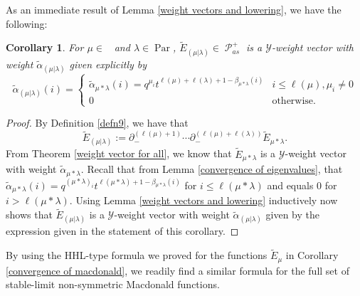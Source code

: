 \documentclass[11pt]{article}
\newtheorem{coro}[theo]{Corollary}
\theoremstyle{definition}
\numberwithin{equation}{section}
\newcommand{\y}{{ \mathscr{Y} }}
\DeclareMathOperator{\sP}{\mathscr{P} }
\DeclareMathOperator{\Par}{\mathrm{Par}}
\DeclareMathOperator{\Compred}{\mathrm{Comp}^{\textit{red}}}
\begin{document}
As an immediate result of Lemma \ref{weight vectors and lowering}, we have the following:
\begin{coro}\label{stable macdonald are weight vectors}
    For $\mu \in \Compred$ and $\lambda \in \Par$,  $\widetilde{E}_{(\mu|\lambda)} \in \sP_{as}^{+}$ is a $\y$-weight vector with weight $\widetilde{\alpha}_{(\mu|\lambda)}$ given explicitly by
\begin{equation}
    \widetilde{\alpha}_{(\mu|\lambda)}(i) = 
    \begin{cases}
    \widetilde{\alpha}_{\mu*\lambda}(i) = q^{\mu_i}t^{\ell(\mu)+\ell(\lambda)+1-\beta_{\mu*\lambda}(i)} & i\leq \ell(\mu) , \mu_i \neq 0 \\
    0 & \text{otherwise}.
     \end{cases}
\end{equation}
\end{coro}
\begin{proof}
   By Definition \ref{defn9}, we have that $$\widetilde{E}_{(\mu|\lambda)} :=  \partial_{-}^{(\ell(\mu)+1)}\cdots \partial_{-}^{(\ell(\mu)+\ell(
\lambda))} \widetilde{E}_{\mu*\lambda}. $$
From Theorem \ref{weight vector for all}, we know that $\widetilde{E}_{\mu*\lambda}$ is a $\y$-weight vector with weight $\widetilde{\alpha}_{\mu*\lambda}.$ Recall that from Lemma \ref{convergence of eigenvalues}, that $\widetilde{\alpha}_{\mu*\lambda}(i) = q^{(\mu*\lambda)_i}t^{\ell(\mu*\lambda)+1-\beta_{\mu*\lambda}(i)}$ for $i \leq \ell(\mu*\lambda)$ and equals $0$ for $i > \ell(\mu*\lambda).$ Using Lemma \ref{weight vectors and lowering} inductively now shows that $\widetilde{E}_{(\mu|\lambda)}$ is a $\y$-weight vector with weight $\widetilde{\alpha}_{(\mu|\lambda)}$ given by the expression given in the statement of this corollary. 
\end{proof}

By using the HHL-type formula we proved for the functions $\widetilde{E}_{\mu}$ in Corollary \ref{convergence of macdonald}, we readily find a similar formula for the full set of stable-limit non-symmetric Macdonald functions. 
\end{document}
